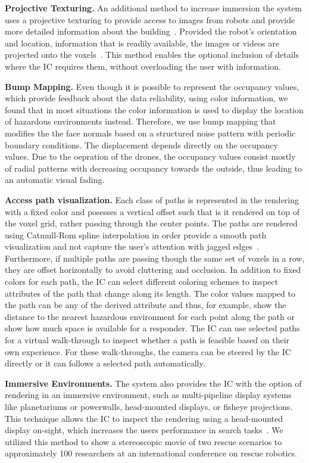 \textbf{Projective Texturing. }  An additional method to increase immersion the system uses a projective texturing to provide access to images from robots and provide more detailed information about the building~\cite{segal1992fast, everitt2001projective}.  Provided the robot's orientation and location, information that is readily available, the images or videos are projected onto the voxels~\cite{zhao2005alignment}.  This method enables the optional inclusion of details where the IC requires them, without overloading the user with information.

\textbf{Bump Mapping. }  Even though it is possible to represent the occupancy values, which provide feedback about the data reliability, using color information, we found that in most situations the color information is used to display the location of hazardous environments instead.  Therefore, we use bump mapping that modifies the the face normals based on a structured noise pattern with periodic boundary conditions.  The displacement depends directly on the occupancy values.  Due to the oepration of the drones, the occupancy values consist mostly of radial patterns with decreasing occupancy towards the outside, thus leading to an automatic visual fading.

\textbf{Access path visualization. }  Each class of paths is represented in the  rendering with a fixed color and posesses a vertical offset such that is it rendered on top of the voxel grid, rather passing through the center points.  The paths are rendered using Catmull-Rom spline interpolation in order provide a smooth path visualization and not capture the user's attention with jagged edges~\cite{catmull1974class}.  Furthermore, if multiple paths are passing though the same set of voxels in a row, they are offset horizontally to avoid cluttering and occlusion.  In addition to fixed colors for each path, the IC can select different coloring schemes to inspect attributes of the path that change along its length.  The color values mapped to the path can be any of the derived attribute and thus, for example, show the distance to the nearest hazardous environment for each point along the path or show how much space is available for a responder.  The IC can use selected paths for a virtual walk-through to inspect whether a path is feasible based on their own experience.  For these walk-throughs, the camera can be steered by the IC directly or it can follows a selected path automatically.

\textbf{Immersive Environments. }  The system also provides the IC with the option of rendering in an immersive environment, such as multi-pipeline display systems like planetariums or powerwalls, head-mounted displays, or fisheye projections.  This technique allows the IC to inspect the rendering using a head-mounted display on-sight, which increases the users performance in search tasks~\cite{pausch1997quantifying}.  We utilized this method to show a stereoscopic movie of two rescue scenarios to approximately 100 researchers at an international conference on rescue robotics.  

